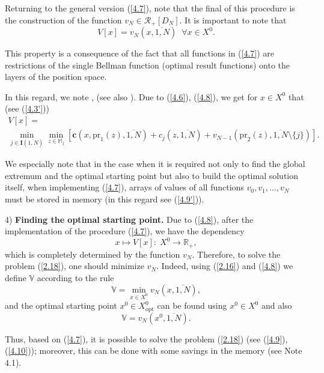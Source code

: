 \documentclass[numbers,sort&compress]{IntechOpen-Book}%
\begin{document}
Returning to the general version (\ref{4.7}),
note that the final of this procedure is the construction of the function
$v_N \in \mathcal{R}_+[D_N]$.
It is important to note that
\begin{equation}\label{4.8}
  V[x] = v_N(x,\overline{1,N})\;\;\forall{x} \in X^0.
\end{equation}

This property is a consequence of the fact
that all functions in
 (\ref{4.7}) are restrictions of the single Bellman function
(optimal result functions)
onto the layers of the position space.

In this regard, we note
\cite[$\S$4.9]{14}, \cite{18}
(see also \cite[(4.3.1)]{4}).
Due to (\ref{4.6}), (\ref{4.8}),
we get for
$x \in X^0$
that
(see (\ref{4.3'}))
\begin{multline}
  \label{4.9'}
  V[x] = \\
  \min\limits_{j \in \mathbf{I}(\overline{1,N})} \min\limits_{z \in \mathbb{M}_j}
  [\mathbf{c}(x,\mathrm{pr}_1(z),\overline{1,N}) + c_j(z,\overline{1,N}) + v_{N-1}(\mathrm{pr}_2(z),\overline{1,N} \setminus \{j\})].
\end{multline}

We especially note that in the case
when it is required not only to find the global extremum
and the optimal starting point
but also to build the optimal solution itself,
when implementing (\ref{4.7}),
arrays of values of all functions
$v_0,v_1,...,v_N$
must be stored in memory
(in this regard see (\ref{4.9'})).

4) {\bf Finding the optimal starting point.}
Due to
 (\ref{4.8}),
after the implementation of the procedure
 (\ref{4.7}), we have the dependency
$$
  x \longmapsto V[x]:\;X^0 \longrightarrow \mathbb{R}_+,
$$
which is completely determined by the function
$v_N$.
Therefore, to solve the problem (\ref{2.18}), one should minimize
$v_N$.
Indeed,
using (\ref{2.16}) and (\ref{4.8})
we define
$\mathbb{V}$
according to the rule
\begin{equation}\label{4.9}
  \mathbb{V} = \min\limits_{x \in X^0} v_N(x,\overline{1,N}),
\end{equation}
and the optimal starting point
$x^0 \in X^0_{\mathrm{opt}}$
can be found using
$x^0 \in X^0$ and also
\begin{equation}\label{4.10}
  \mathbb{V} = v_N(x^0,\overline{1,N}).
\end{equation}

Thus,
based on (\ref{4.7}),
it is possible to
solve the problem (\ref{2.18})
(see (\ref{4.9}), (\ref{4.10}));
moreover,
this can be done with some savings in the memory
(see Note 4.1).
\end{document}
